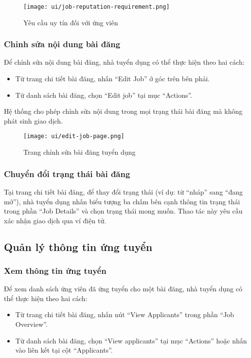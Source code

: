 \begin{figure}[H]
  \centering
  \texttt{[image: ui/job-reputation-requirement.png]}
  \caption{Yêu cầu uy tín đối với ứng viên}
  \label{fig:job-reputation-requirement}
\end{figure}

\subsubsection{Chỉnh sửa nội dung bài đăng}

Để chỉnh sửa nội dung bài đăng, nhà tuyển dụng có thể thực hiện theo hai cách:
\begin{itemize}
  \item Từ trang chi tiết bài đăng, nhấn ``Edit Job'' ở góc trên bên phải.
  \item Từ danh sách bài đăng, chọn ``Edit job'' tại mục ``Actions''.
\end{itemize}

Hệ thống cho phép chỉnh sửa nội dung trong mọi trạng thái bài đăng mà không phát sinh giao dịch.

\begin{figure}[H]
  \centering
  \texttt{[image: ui/edit-job-page.png]}
  \caption{Trang chỉnh sửa bài đăng tuyển dụng}
  \label{fig:edit-job-page}
\end{figure}

\subsubsection{Chuyển đổi trạng thái bài đăng}

Tại trang chi tiết bài đăng, để thay đổi trạng thái (ví dụ: từ ``nháp'' sang ``đang mở''), nhà tuyển dụng nhấn biểu tượng ba chấm bên cạnh thông tin trạng thái trong phần ``Job Details'' và chọn trạng thái mong muốn.  
Thao tác này yêu cầu xác nhận giao dịch qua ví điện tử.

\subsection{Quản lý thông tin ứng tuyển}

\subsubsection{Xem thông tin ứng tuyển}

Để xem danh sách ứng viên đã ứng tuyển cho một bài đăng, nhà tuyển dụng có thể thực hiện theo hai cách:
\begin{itemize}
  \item Từ trang chi tiết bài đăng, nhấn nút ``View Applicants'' trong phần ``Job Overview''.
  \item Từ danh sách bài đăng, chọn ``View applicants'' tại mục ``Actions'' hoặc nhấn vào liên kết tại cột ``Applicants''.
\end{itemize}

